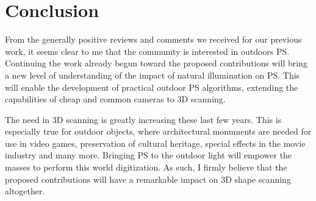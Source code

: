 \documentclass{report}
\begin{document}
\chapter{Conclusion}\label{conclusion}

From the generally positive reviews and comments we received for our previous work, it seems clear to me that the community is interested in outdoors PS. Continuing the work already begun toward the proposed contributions will bring a new level of understanding of the impact of natural illumination on PS. This will enable the development of practical outdoor PS algorithms, extending the capabilities of cheap and common cameras to 3D scanning.

The need in 3D scanning is greatly increasing these last few years. This is especially true for outdoor objects, where architectural monuments are needed for use in video games, preservation of cultural heritage, special effects in the movie industry and many more. Bringing PS to the outdoor light will empower the masses to perform this world digitization. As such, I firmly believe that the proposed contributions will have a remarkable impact on 3D shape scanning altogether.





%

{\small


}
\end{document}
